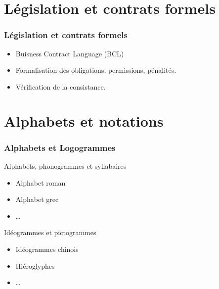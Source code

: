 \documentclass{beamer}
\begin{document}
\section[Contrats]{Législation et contrats formels}

\begin{frame}
  \frametitle{Législation et contrats formels}
  \begin{itemize}
  \item Buisness Contract Language (BCL)%
  \item Formalisation des obligations, permissions, pénalités.%
  \item Vérification de la consistance.
  \end{itemize}
\end{frame}

\section[Alphabets]{Alphabets et notations}

\begin{frame}
  \frametitle{Alphabets et Logogrammes}
  \begin{block}{Alphabets, phonogrammes et syllabaires}
  \begin{itemize}
  \item Alphabet roman
  \item Alphabet grec
  \item \dots
  \end{itemize}
  \end{block}
  \begin{block}{Idéogrammes et pictogrammes}
  \begin{itemize}
  \item Idéogrammes chinois
  \item Hiéroglyphes
  \item \dots
  \end{itemize}
  \end{block}
\end{frame}
\end{document}
